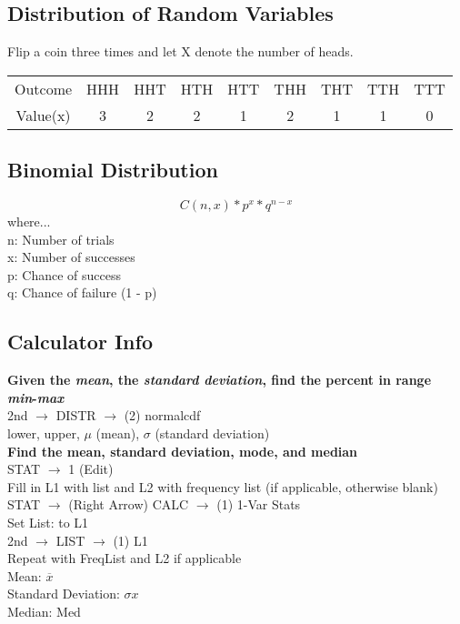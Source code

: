 \documentclass[]{article}
\newcommand*\ra{$\rightarrow$ }
\newcommand{\bd}{\textbf}
\begin{document}
	\subsection*{Distribution of Random Variables}
	Flip a coin three times and let X denote the number of heads.
	\begin{center}
		\begin{tabular}{ |c|c|c|c|c|c|c|c|c| }
			\hline 
				Outcome & HHH & HHT & HTH & HTT & THH & THT & TTH &  TTT \\
				Value(x) & 3 & 2 & 2 & 1 & 2 & 1 & 1 & 0 \\
			\hline
		\end{tabular}
	\end{center}

	\subsection*{Binomial Distribution}
		\begin{equation*}
			C(n, x) * p^x * q^{n - x}
		\end{equation*}
	where... \\
	\indent n: Number of trials \\
	\indent x: Number of successes \\
	\indent p: Chance of success \\
	\indent q: Chance of failure (1 - p) 
	
	\subsection*{Calculator Info}
		\bd{Given the \emph{mean}, the \emph{standard deviation}, find the percent in range \emph{min}-\emph{max}} \\
	\indent 2nd \ra DISTR \ra (2) normalcdf \\
	\indent lower, upper, $\mu$ (mean), $\sigma$ (standard deviation) \\
	
	\noindent \bd{Find the mean, standard deviation, mode, and median} \\
	\indent STAT \ra 1 (Edit) \\
	\indent Fill in L1 with list and L2 with frequency list (if applicable, otherwise blank) \\
	\indent STAT \ra (Right Arrow) CALC \ra (1) 1-Var Stats \\
	\indent Set List: to L1 \\
	\indent 2nd \ra LIST \ra (1) L1 \\
	\indent Repeat with FreqList and L2 if applicable \\
	\indent Mean: $\overline{x}$ \\
	\indent Standard Deviation: $\sigma{}x$ \\
	\indent Median: Med \\
	
\end{document}

